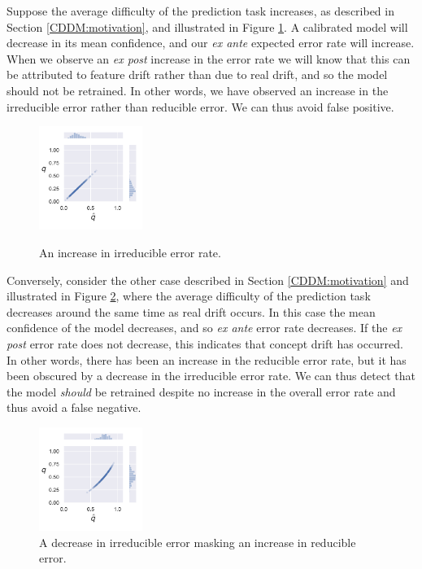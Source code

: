 Suppose the average difficulty of the prediction task increases, as described in Section \ref{CDDM:motivation}, and illustrated in Figure \ref{fig:pos_virt}. A calibrated model will decrease in its mean confidence, and our {\it ex  ante} expected error rate will increase. When we observe an {\it ex post} increase in the error rate we will know that this can be attributed to feature drift rather than due to real drift, and so the model should not be retrained. In other words, we have observed an increase in the irreducible error rather than reducible error. We can thus avoid false positive.

\begin{figure}
    \centering
    \includegraphics[width=0.3\textwidth]{images/positive_virtual.pdf}
    \label{fig:pos_virt}
    \caption{An increase in irreducible error rate.}
\end{figure}

Conversely, consider the other case described in Section \ref{CDDM:motivation} and illustrated in Figure \ref{fig:co_drift}, where the average difficulty of the prediction task decreases around the same time as real drift occurs. In this case the mean confidence of the model decreases, and so {\it ex ante} error rate decreases. If the {\it ex post} error rate does not decrease, this indicates that concept drift has occurred. In other words, there has been an increase in the reducible error rate, but it has been obscured by a decrease in the irreducible error rate. We can thus detect that the model {\it should} be retrained despite no increase in the overall error rate and thus avoid a false negative.

\begin{figure}
    \centering
        \includegraphics[width=0.3\textwidth]{images/hidden_drift.pdf}
    \caption{A decrease in irreducible error masking an increase in reducible error.}
    \label{fig:co_drift}
\end{figure}

